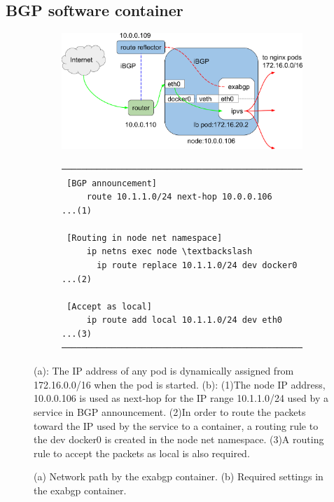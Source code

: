 \subsection{BGP software container}

\begin{figure}[tb]

  \begin{subfigure}[t]{\columnwidth}
    \includegraphics[width=0.9\columnwidth]{Figs/exabgp}
    \caption{}
    \label{fig:exabgp_schem}
  \end{subfigure}

  \par\bigskip

  \begin{subfigure}[t]{\columnwidth}

\begin{Verbatim}[commandchars=\\\{\}]
───────────────────────────────────────────────────────
 [BGP announcement]
     route 10.1.1.0/24 next-hop 10.0.0.106       ...(1)

 [Routing in node net namespace]
     ip netns exec node \textbackslash
       ip route replace 10.1.1.0/24 dev docker0  ...(2)
      
 [Accept as local]
     ip route add local 10.1.1.0/24 dev eth0     ...(3)
───────────────────────────────────────────────────────
\end{Verbatim}
    \caption{}
    \label{fig:exabgp_setting}
  \end{subfigure}

  \caption{
    (a) Network path by the exabgp container.
    (b) Required settings in the exabgp container.
  }
  (a): The IP address of any pod is dynamically assigned from 172.16.0.0/16 when the pod is started. 
  (b): (1)The node IP address, 10.0.0.106 is used as next-hop for the IP range 10.1.1.0/24 used by a service in BGP announcement.
  (2)In order to route the packets toward the IP used by the service to a container, a routing rule to the dev docker0 is created in the node net namespace.
  (3)A routing rule to accept the packets as local is also required. 
  \label{fig:exabgp}
\end{figure}


